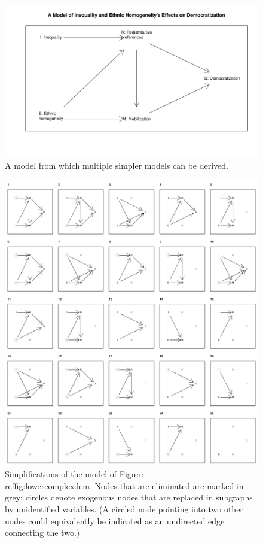 \documentclass[
  12pt,
]{book}
\begin{document}
\begin{figure}

{\centering \includegraphics[width=.5\textwidth]{ii_files/figure-latex/lowercomplexdem-1} 

}

\caption{A model  from which multiple simpler models can be derived.}\label{fig:lowercomplexdem}
\end{figure}

\begin{figure}

{\centering \includegraphics{ii_files/figure-latex/runningsubs-1} 

}

\caption{Simplifications of the model of Figure \\ref{fig:lowercomplexdem}. Nodes that are eliminated are marked in grey; circles denote exogenous nodes that are replaced in subgraphs by unidentified variables. (A circled node pointing into two other nodes could equivalently be indicated as an undirected edge connecting the two.)}\label{fig:runningsubs}
\end{figure}
\end{document}
